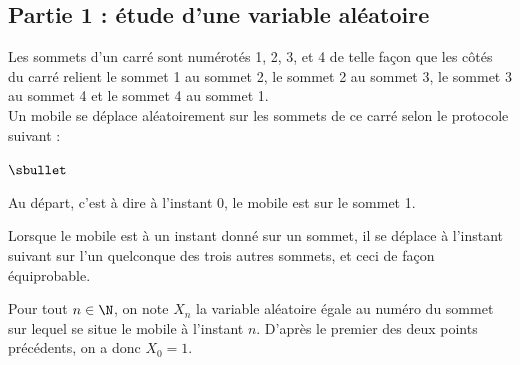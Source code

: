 \documentclass[11pt]{article}%
\begin{document}
\subsection*{Partie 1 : étude d'une variable aléatoire}

\noindent
Les sommets d'un carré sont numérotés 1, 2, 3, et 4 de telle façon que
les côtés du carré relient le sommet 1 au sommet 2, le sommet 2 au
sommet 3, le sommet 3 au sommet 4 et le sommet 4 au sommet 1.\\
Un mobile se déplace aléatoirement sur les sommets de ce carré selon
le protocole suivant :
\begin{noliste}{$\sbullet$}
\item Au départ, c'est à dire à l'instant $0$, le mobile est sur le
  sommet 1.
\item Lorsque le mobile est à un instant donné sur un sommet, il se
  déplace à l'instant suivant sur l'un quelconque des trois autres
  sommets, et ceci de façon équiprobable.
\end{noliste}
Pour tout $n \in \N$, on note $X_{n}$ la variable aléatoire égale au
numéro du sommet sur lequel se situe le mobile à l'instant
$n$. D'après le premier des deux points précédents, on a donc $X_{0} =
1$.
\end{document}

